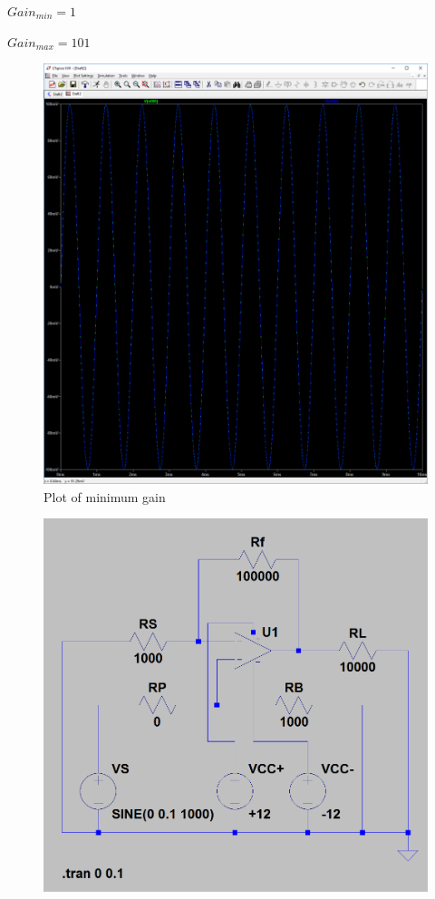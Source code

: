 \documentclass[10pt]{article}
\begin{document}
{\doublespacing
\noindent $Gain_{min} = 1$

\noindent $Gain_{max} = 101$
\begin{figure}[H]
	\centering
	\includegraphics[width=\textwidth]{PreLab3a1.PNG}
	\caption{Plot of minimum gain}
\end{figure}
\begin{figure}[H]
	\centering
	\includegraphics[width=\textwidth]{0.PNG}

\end{figure}}
\end{document}
